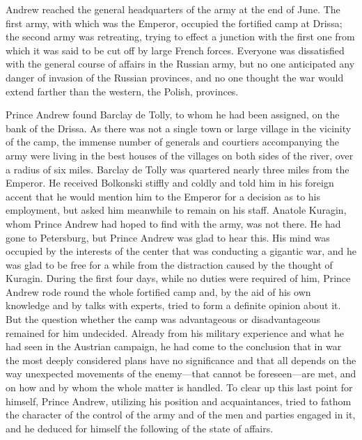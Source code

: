  Andrew reached the general headquarters of the army at the
end of June. The first army, with which was the Emperor, occupied
the fortified camp at Drissa; the second army was retreating,
trying to effect a junction with the first one from which it was
said to be cut off by large French forces. Everyone was
dissatisfied with the general course of affairs in the Russian
army, but no one anticipated any danger of invasion of the
Russian provinces, and no one thought the war would extend
farther than the western, the Polish, provinces.

Prince Andrew found Barclay de Tolly, to whom he had been
assigned, on the bank of the Drissa. As there was not a single
town or large village in the vicinity of the camp, the immense
number of generals and courtiers accompanying the army were
living in the best houses of the villages on both sides of the
river, over a radius of six miles. Barclay de Tolly was quartered
nearly three miles from the Emperor. He received Bolkonski
stiffly and coldly and told him in his foreign accent that he
would mention him to the Emperor for a decision as to his
employment, but asked him meanwhile to remain on his
staff. Anatole Kuragin, whom Prince Andrew had hoped to find with
the army, was not there. He had gone to Petersburg, but Prince
Andrew was glad to hear this. His mind was occupied by the
interests of the center that was conducting a gigantic war, and
he was glad to be free for a while from the distraction caused by
the thought of Kuragin. During the first four days, while no
duties were required of him, Prince Andrew rode round the whole
fortified camp and, by the aid of his own knowledge and by talks
with experts, tried to form a definite opinion about it. But the
question whether the camp was advantageous or disadvantageous
remained for him undecided. Already from his military experience
and what he had seen in the Austrian campaign, he had come to the
conclusion that in war the most deeply considered plans have no
significance and that all depends on the way unexpected movements
of the enemy---that cannot be foreseen---are met, and on how and
by whom the whole matter is handled.  To clear up this last point
for himself, Prince Andrew, utilizing his position and
acquaintances, tried to fathom the character of the control of
the army and of the men and parties engaged in it, and he deduced
for himself the following of the state of affairs.

